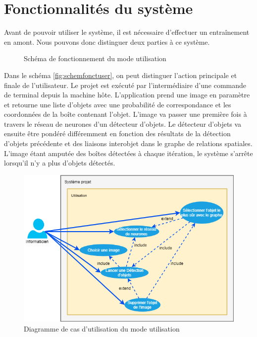 \documentclass[debug,nodate,hideweeklyreports,noposter]{polytech/polytech}
\begin{document}
\section{Fonctionnalités du système}

Avant de pouvoir utiliser le système, il est nécessaire d’effectuer un entraînement en amont. Nous pouvons donc distinguer deux parties à ce système.
\begin{figure}[H]
  \caption{Schéma de fonctionnement du mode utilisation}
  \label{fig:schemfonctuser}
\end{figure}

Dans le schéma \autoref{fig:schemfonctuser}, on peut distinguer l’action principale et finale de l’utilisateur. 
Le projet est exécuté par l’intermédiaire d’une commande de terminal depuis la machine hôte. L’application prend une image en paramètre et retourne une liste d’objets avec une probabilité de correspondance et les coordonnées de la boîte contenant l’objet. L’image va passer une première fois à travers le réseau de neurones d’un détecteur d’objets. Le détecteur d’objets va ensuite être pondéré différemment en fonction des résultats de la détection d’objets précédente et des liaisons interobjet dans le graphe de relations spatiales.  L’image étant amputée des boîtes détectées à chaque itération, le système s’arrête lorsqu’il n’y a plus d’objets détectés. 

\begin{figure}[H]
  \includegraphics[width=16cm]{images/C_fonctsys2userusecase.png}
  \caption{Diagramme de cas d'utilisation du mode utilisation}
  \label{fig:usecaseuser}
\end{figure}
\end{document}
